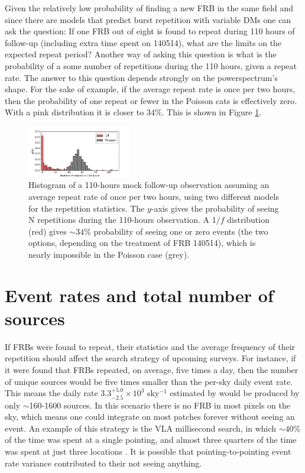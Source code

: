 \documentclass[useAMS,usenatbib]{mn2e}
\begin{document}
Given the relatively low probability of finding 
a new FRB in the same field and since there are models that predict
burst repetition with variable DMs \citep{2015arXiv150505535C, 2015arXiv150701002M}
one can ask the question: If one FRB out of eight is found to
repeat during 110 hours of follow-up (including extra time spent on 140514), 
what are the limits on the expected
repeat period? Another way of asking this question is what is the probability of 
a some number of repetitions during the 110 hours, given a repeat rate. The answer to 
this question depends strongly on the powerspectrum's shape. For the sake of example, if the average 
repeat rate is once per two hours, then the probability of one repeat or fewer in the Poisson
cats is effectively zero. With a pink distribution it is closer to $34\%$. This is 
shown in Figure \ref{FIG-hist}. 

\begin{figure}
  \centering
   \includegraphics[trim={0in, 0in, 0in, 0in}, width=0.4\textwidth, height=0.23\textwidth]{110_hours_followup.png}
   \caption{Histogram of a 110-hours mock follow-up observation assuming an average repeat rate of 
   once per two hours, using two different models 
   for the repetition statistics. The $y$-axis gives the probability of seeing 
   N repetitions during the 110-hours observation.
   A 1$/f$ distribution (red) gives $\sim34\%$ probability of seeing one or zero events 
   (the two options, depending on the treatment of FRB 140514), 
   which is nearly impossible in the Poisson case (grey).}
   \label{FIG-hist}
\end{figure}


\section{Event rates and total number of sources}
\label{rate}

If FRBs were found to repeat, their statistics and the
average frequency of their repetition 
should affect the search strategy of upcoming surveys. 
For instance, if it were found that FRBs repeated,
on average, five times a day, then the number of unique 
sources would be five times smaller than the per-sky 
daily event rate. This means the daily rate 
$3.3^{+5.0}_{-2.5}\times10^3$ sky$^{-1}$ estimated by 
\cite{2015arXiv150500834R} would be produced by
only $\sim$160-1600 sources. In this scenario 
there is no FRB in most pixels on the sky, which means
one could integrate on most patches forever without 
seeing an event. An example of this strategy is the VLA millisecond search, 
in which $\sim40\%$ of the time was spent at a single pointing, and
almost three quarters of the time was spent at just three locations \citep{2015ApJ...807...16L}.
It is possible that pointing-to-pointing event rate variance contributed 
to their not seeing anything.
\end{document}
